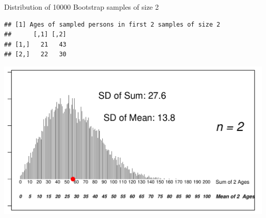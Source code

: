\documentclass[10pt]{beamer}\usepackage[]{graphicx}\usepackage[]{color}
\makeatletter
\def\maxwidth{ %
  \ifdim\Gin@nat@width>\linewidth
    \linewidth
  \else
    \Gin@nat@width
  \fi
}
\newenvironment{kframe}{%
 \def\at@end@of@kframe{}%
 \ifinner\ifhmode%
  \def\at@end@of@kframe{\end{minipage}}%
  \begin{minipage}{\columnwidth}%
 \fi\fi%
 \def\FrameCommand##1{\hskip\@totalleftmargin \hskip-\fboxsep
 \colorbox{shadecolor}{##1}\hskip-\fboxsep
     \hskip-\linewidth \hskip-\@totalleftmargin \hskip\columnwidth}%
 \MakeFramed {\advance\hsize-\width
   \@totalleftmargin\z@ \linewidth\hsize
   \@setminipage}}%
 {\par\unskip\endMakeFramed%
 \at@end@of@kframe}
\newenvironment{knitrout}{}{} %
\makeatother
\begin{document}
\begin{frame}[fragile]{Distribution of 10000 Bootstrap samples of size 2}
\begin{knitrout}\tiny
{}\color{fgcolor}\begin{kframe}
\begin{verbatim}
## [1] Ages of sampled persons in first 2 samples of size 2
##      [,1] [,2]
## [1,]   21   43
## [2,]   22   30
\end{verbatim}
\end{kframe}

{\centering \includegraphics[width=\maxwidth]{figure/unnamed-chunk-2-1} 

}



\end{knitrout}
	
\end{frame}
\end{document}
